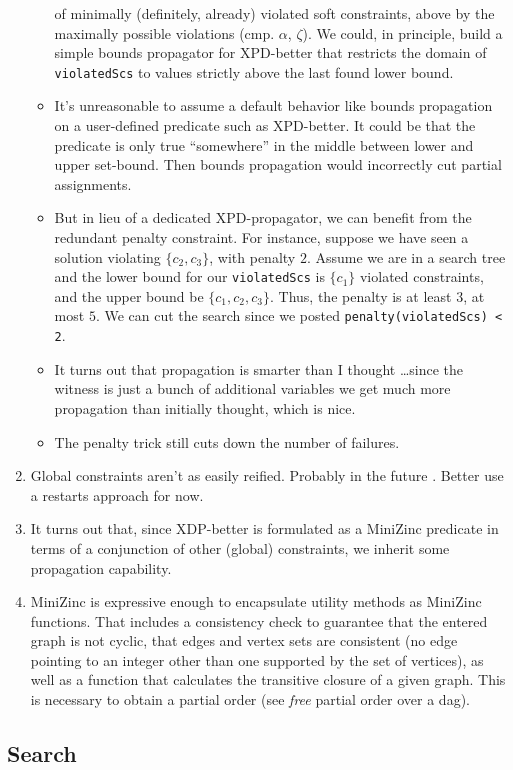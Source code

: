 \begin{enumerate}
\begin{itemize}
of minimally (definitely, already) violated soft constraints, above by the maximally possible violations (cmp. $\alpha$, $\zeta$).
We could, in principle, build a simple bounds propagator for XPD-better that restricts the domain of  \texttt{violatedScs}
to values strictly above the last found lower bound.
\item It's unreasonable to assume a default behavior like bounds propagation on a user-defined predicate such as XPD-better.
It could be that the predicate is only true ``somewhere'' in the middle between lower and upper set-bound. Then bounds propagation
would incorrectly cut partial assignments.
\item But in lieu of a dedicated XPD-propagator, we can benefit from the redundant penalty constraint. For instance, suppose 
we have seen a solution violating $\{c_2,c_3\}$, with penalty $2$. Assume we are in a search tree and the lower bound for our \texttt{violatedScs}
is $\{c_1\}$ violated constraints, and the upper bound be $\{c_1,c_2,c_3\}$. Thus, the penalty is at least $3$, at most $5$. We can cut the
search since we posted \texttt{penalty(violatedScs) < 2}.
\item It turns out that propagation is smarter than I thought \ldots since the witness is just a bunch of additional variables we get much more
propagation than initially thought, which is nice.
\item The penalty trick still cuts down the number of failures.
\end{itemize}
\item Global constraints aren't as easily reified. Probably in the future . Better use a restarts approach for now.
\item It turns out that, since XDP-better is formulated as a MiniZinc predicate in terms of a conjunction of other (global) constraints, we inherit some propagation capability.
\item MiniZinc is expressive enough to encapsulate utility methods as MiniZinc functions. That includes a consistency check
to guarantee that the entered graph is not cyclic, that edges and vertex sets are consistent (no edge pointing to an integer
other than one supported by the set of vertices), as well as a function that calculates the transitive closure
of a given graph. This is necessary to obtain a partial order (see \emph{free} partial order over a dag). 
\end{enumerate}

\subsection{Search}

